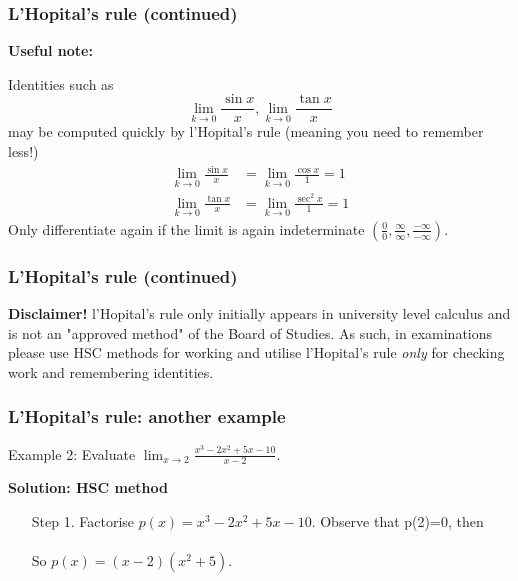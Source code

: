 \documentclass{beamer}
\begin{document}

\begin{frame}
\frametitle{L'Hopital's rule (continued)}

{\bf Useful note:}
			
			Identities such as 
\[
\lim_{k\rightarrow 0} \frac{\sin x}{x}, \lim_{k\rightarrow 0} \frac{\tan x}{x} 
\]
may be computed quickly by l'Hopital's rule (meaning you need to remember less!)
\begin{align*}
\lim_{k\rightarrow 0} \frac{\sin x}{x} &= \lim_{k\rightarrow 0} \frac{\cos x}{1} = 1\\[2mm]
\lim_{k\rightarrow 0} \frac{\tan x}{x} &= \lim_{k\rightarrow 0} \frac{\sec ^2 x}{1} = 1
\end{align*}
 Only differentiate again if the limit is again indeterminate $(\frac{0}{0}, \frac{\infty}{\infty}, \frac{-\infty}{-\infty})$.
\end{frame}



\begin{frame}
\frametitle{L'Hopital's rule (continued)}

 {\bf Disclaimer! } l'Hopital's rule only initially appears in university level calculus and is not an "approved method" of the Board of Studies. As such, in examinations please use HSC methods for working and utilise l'Hopital's rule {\it only} for checking work and remembering identities.

\end{frame}


\begin{frame}
\frametitle{L'Hopital's rule: another example}
			
			\begin{block}{Example 2:}
			Evaluate $\displaystyle{ \lim_{x\rightarrow 2} \frac{ x^3 - 2x^2 + 5x - 10 }{ x-2 } }$.
			\end{block}

 {\bf Solution: HSC method}

 \begin{enumerate}

 \item[Step 1. ] Factorise $p(x) = x^3 - 2x^2 + 5x - 10$. Observe that p(2)=0, then \\
\\
So $p(x)= (x-2)(x^2 + 5)$.

 \end{enumerate}

\end{frame}
\end{document}
